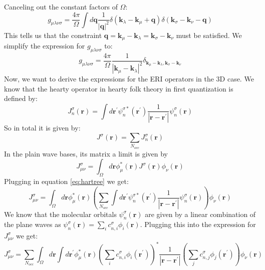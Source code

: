 \documentclass[12pt]{article}
\begin{document}
Canceling out the constant factors of $\Omega$:
\begin{equation}
    g_{\mu\lambda\nu\sigma} = \frac{4\pi}{\Omega} \int d\mathbf{q} \frac{1}{|\mathbf{q}|^2} \delta(\mathbf{k}_\lambda - \mathbf{k}_\mu + \mathbf{q}) \delta(\mathbf{k}_\sigma - \mathbf{k}_\nu - \mathbf{q})
\end{equation}
This tells us that the constraint $\mathbf{q} = \mathbf{k}_\mu - \mathbf{k}_\lambda = \mathbf{k}_\sigma - \mathbf{k}_\nu$ must be satisfied. We simplify the expression for $g_{\mu\lambda\nu\sigma}$ to:
\begin{equation}
    g_{\mu\lambda\nu\sigma} = \frac{4\pi}{\Omega} \frac{1}{|\mathbf{k}_\mu - \mathbf{k}_\lambda|^2} \delta_{\mathbf{k}_\mu - \mathbf{k}_\lambda, \mathbf{k}_\sigma - \mathbf{k}_\nu}
\end{equation}
Now, we want to derive the expressions for the ERI operators in the 3D case. We know that the hearty operator in hearty folk theory in first quantization is defined by:
\begin{equation}
    J^{\sigma }_n(\mathbf{r}) = \int d\mathbf{r}^{\prime} \psi_n^{\sigma *}(\mathbf{r}^{\prime}) \frac{1}{\left|\mathbf{r} - \mathbf{r}^{\prime}\right|} \psi_n^{\sigma }(\mathbf{r})
\label{eq:hartree}
\end{equation}
So in total it is given by:
\begin{equation}
    J^{\sigma }(\mathbf{r}) = \sum_{N_{occ}} J^{\sigma }_n(\mathbf{r})
\end{equation}
In the plain wave bases, its matrix a limit is given by
\begin{equation}
    J^{\sigma }_{\mu\nu} = \int_{\Omega } d\mathbf{r} \phi^*_\mu(\mathbf{r}) J^{\sigma }(\mathbf{r}) \phi_\nu(\mathbf{r})
\end{equation}
Plugging in equation \ref{eq:hartree} we get:
\begin{equation}
    J^{\sigma }_{\mu\nu} = \int_{\Omega } d\mathbf{r} \phi^*_\mu(\mathbf{r}) \left( \sum_{N_{occ}} \int d\mathbf{r}^{\prime} \psi_n^{\sigma *}(\mathbf{r}^{\prime}) \frac{1}{\left|\mathbf{r} - \mathbf{r}^{\prime}\right|} \psi_n^{\sigma }(\mathbf{r}) \right) \phi_\nu(\mathbf{r})
\end{equation}
We know that the molecular orbitals $\psi_n^{\sigma }(\mathbf{r})$ are given by a linear combination of the plane waves as $\psi_n^{\sigma }(\mathbf{r}) = \sum_i c^{\sigma }_{n,i} \phi_i(\mathbf{r})$. Plugging this into the expression for $J^{\sigma }_{\mu\nu}$ we get:
\begin{equation}
    J^{\sigma }_{\mu\nu} = \sum_{N_{occ}} \int_{\Omega } d\mathbf{r} \int d\mathbf{r}^{\prime} \phi^*_\mu(\mathbf{r}) \left( \sum_i c^{\sigma}_{n,i} \phi_i(\mathbf{r}^{\prime}) \right) ^{*} \frac{1}{\left|\mathbf{r} - \mathbf{r}^{\prime}\right|} \left( \sum_j c^{\sigma }_{n,j} \phi_j(\mathbf{r}^{\prime}) \right) \phi_\nu(\mathbf{r})
\end{equation}
\end{document}
